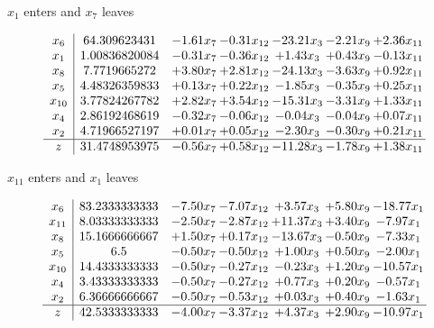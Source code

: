 \documentclass[8pt]{article}
\begin{document}
 $ x_{1} $ enters and $ x_{7} $ leaves 

 \[\begin{array}{c| c c@{\hskip 2pt} c@{\hskip 2pt} c@{\hskip 2pt} c@{\hskip 2pt} c@{\hskip 2pt} }
 x_{6}   &  64.309623431 & -1.61 x_{7} & -0.31 x_{12} & -23.21 x_{3} & -2.21 x_{9} & +  2.36 x_{11}\\
 x_{1}   &  1.00836820084 & -0.31 x_{7} & -0.36 x_{12} & +  1.43 x_{3} & +  0.43 x_{9} & -0.13 x_{11}\\
 x_{8}   &  7.7719665272 & +  3.80 x_{7} & +  2.81 x_{12} & -24.13 x_{3} & -3.63 x_{9} & +  0.92 x_{11}\\
 x_{5}   &  4.48326359833 & +  0.13 x_{7} & +  0.22 x_{12} & -1.85 x_{3} & -0.35 x_{9} & +  0.25 x_{11}\\
 x_{10}   &  3.77824267782 & +  2.82 x_{7} & +  3.54 x_{12} & -15.31 x_{3} & -3.31 x_{9} & +  1.33 x_{11}\\
 x_{4}   &  2.86192468619 & -0.32 x_{7} & -0.06 x_{12} & -0.04 x_{3} & -0.04 x_{9} & +  0.07 x_{11}\\
 x_{2}   &  4.71966527197 & +  0.01 x_{7} & +  0.05 x_{12} & -2.30 x_{3} & -0.30 x_{9} & +  0.21 x_{11}\\
\hline
z    &  31.4748953975 & -0.56 x_{7} & +  0.58 x_{12} & -11.28 x_{3} & -1.78 x_{9} & +  1.38 x_{11}\\
\end{array}\]


 $ x_{11} $ enters and $ x_{1} $ leaves 

 \[\begin{array}{c| c c@{\hskip 2pt} c@{\hskip 2pt} c@{\hskip 2pt} c@{\hskip 2pt} c@{\hskip 2pt} }
 x_{6}   &  83.2333333333 & -7.50 x_{7} & -7.07 x_{12} & +  3.57 x_{3} & +  5.80 x_{9} & -18.77 x_{1}\\
 x_{11}   &  8.03333333333 & -2.50 x_{7} & -2.87 x_{12} & + 11.37 x_{3} & +  3.40 x_{9} & -7.97 x_{1}\\
 x_{8}   &  15.1666666667 & +  1.50 x_{7} & +  0.17 x_{12} & -13.67 x_{3} & -0.50 x_{9} & -7.33 x_{1}\\
 x_{5}   &  6.5 & -0.50 x_{7} & -0.50 x_{12} & +  1.00 x_{3} & +  0.50 x_{9} & -2.00 x_{1}\\
 x_{10}   &  14.4333333333 & -0.50 x_{7} & -0.27 x_{12} & -0.23 x_{3} & +  1.20 x_{9} & -10.57 x_{1}\\
 x_{4}   &  3.43333333333 & -0.50 x_{7} & -0.27 x_{12} & +  0.77 x_{3} & +  0.20 x_{9} & -0.57 x_{1}\\
 x_{2}   &  6.36666666667 & -0.50 x_{7} & -0.53 x_{12} & +  0.03 x_{3} & +  0.40 x_{9} & -1.63 x_{1}\\
\hline
z    &  42.5333333333 & -4.00 x_{7} & -3.37 x_{12} & +  4.37 x_{3} & +  2.90 x_{9} & -10.97 x_{1}\\
\end{array}\]
\end{document}
